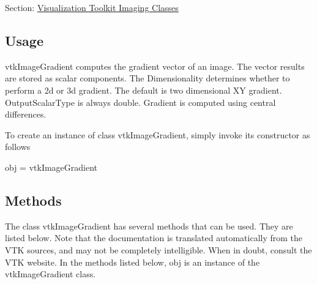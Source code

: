 Section\-: \hyperlink{sec_vtkimaging}{Visualization Toolkit Imaging Classes} \hypertarget{vtkwidgets_vtkxyplotwidget_Usage}{}\subsection{Usage}\label{vtkwidgets_vtkxyplotwidget_Usage}
vtk\-Image\-Gradient computes the gradient vector of an image. The vector results are stored as scalar components. The Dimensionality determines whether to perform a 2d or 3d gradient. The default is two dimensional X\-Y gradient. Output\-Scalar\-Type is always double. Gradient is computed using central differences.

To create an instance of class vtk\-Image\-Gradient, simply invoke its constructor as follows \begin{DoxyVerb}  obj = vtkImageGradient
\end{DoxyVerb}
 \hypertarget{vtkwidgets_vtkxyplotwidget_Methods}{}\subsection{Methods}\label{vtkwidgets_vtkxyplotwidget_Methods}
The class vtk\-Image\-Gradient has several methods that can be used. They are listed below. Note that the documentation is translated automatically from the V\-T\-K sources, and may not be completely intelligible. When in doubt, consult the V\-T\-K website. In the methods listed below, {\ttfamily obj} is an instance of the vtk\-Image\-Gradient class. 

